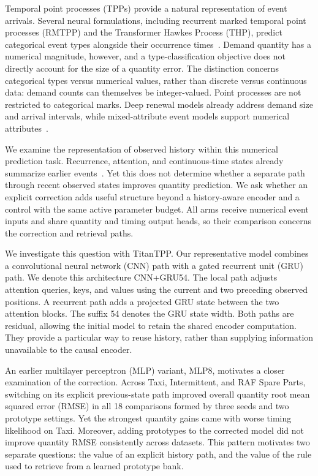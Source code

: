 \documentclass[runningheads]{llncs}
\newcommand{\method}{TitanTPP}
\begin{document}
Temporal point processes (TPPs) provide a natural representation of event arrivals. Several neural formulations, including recurrent marked temporal point processes (RMTPP) and the Transformer Hawkes Process (THP), predict categorical event types alongside their occurrence times~\cite{du2016rmtpp,zuo2020thp}. Demand quantity has a numerical magnitude, however, and a type-classification objective does not directly account for the size of a quantity error. The distinction concerns categorical types versus numerical values, rather than discrete versus continuous data: demand counts can themselves be integer-valued. Point processes are not restricted to categorical marks. Deep renewal models already address demand size and arrival intervals, while mixed-attribute event models support numerical attributes~\cite{turkmen2021renewal,draxler2025flextpp}.

We examine the representation of observed history within this numerical prediction task. Recurrence, attention, and continuous-time states already summarize earlier events~\cite{mei2017nhp,yang2022anhp,chang2025s2p2}. Yet this does not determine whether a separate path through recent observed states improves quantity prediction. We ask whether an explicit correction adds useful structure beyond a history-aware encoder and a control with the same active parameter budget. All arms receive numerical event inputs and share quantity and timing output heads, so their comparison concerns the correction and retrieval paths.

We investigate this question with \method. Our representative model combines a convolutional neural network (CNN) path with a gated recurrent unit (GRU) path. We denote this architecture CNN+GRU54. The local path adjusts attention queries, keys, and values using the current and two preceding observed positions. A recurrent path adds a projected GRU state between the two attention blocks. The suffix 54 denotes the GRU state width. Both paths are residual, allowing the initial model to retain the shared encoder computation. They provide a particular way to reuse history, rather than supplying information unavailable to the causal encoder.

An earlier multilayer perceptron (MLP) variant, MLP8, motivates a closer examination of the correction. Across Taxi, Intermittent, and RAF Spare Parts, switching on its explicit previous-state path improved overall quantity root mean squared error (RMSE) in all 18 comparisons formed by three seeds and two prototype settings. Yet the strongest quantity gains came with worse timing likelihood on Taxi. Moreover, adding prototypes to the corrected model did not improve quantity RMSE consistently across datasets. This pattern motivates two separate questions: the value of an explicit history path, and the value of the rule used to retrieve from a learned prototype bank.
\end{document}

